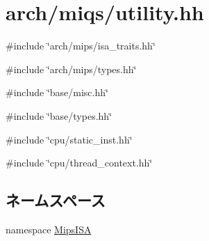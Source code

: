 \hypertarget{miqs_2utility_8hh}{
\section{arch/miqs/utility.hh}
\label{miqs_2utility_8hh}
}
{\ttfamily \#include \char`\"{}arch/mips/isa\_\-traits.hh\char`\"{}}\par
{\ttfamily \#include \char`\"{}arch/mips/types.hh\char`\"{}}\par
{\ttfamily \#include \char`\"{}base/misc.hh\char`\"{}}\par
{\ttfamily \#include \char`\"{}base/types.hh\char`\"{}}\par
{\ttfamily \#include \char`\"{}cpu/static\_\-inst.hh\char`\"{}}\par
{\ttfamily \#include \char`\"{}cpu/thread\_\-context.hh\char`\"{}}\par
\subsection*{ネームスペース}
\begin{DoxyCompactItemize}
\item 
namespace \hyperlink{namespaceMipsISA}{MipsISA}
\end{DoxyCompactItemize}
